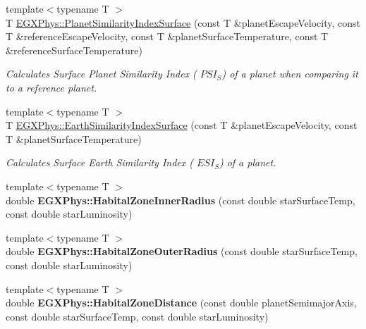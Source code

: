 \begin{DoxyCompactItemize}
{\footnotesize template$<$typename T $>$ }\\T \hyperlink{group___astrophysics_gae0c7dce2779d66b0560ca388a34ddc39}{E\+G\+X\+Phys\+::\+Planet\+Similarity\+Index\+Surface} (const T \&planet\+Escape\+Velocity, const T \&reference\+Escape\+Velocity, const T \&planet\+Surface\+Temperature, const T \&reference\+Surface\+Temperature)
\begin{DoxyCompactList}\small\item\em Calculates Surface Planet Similarity Index ( $PSI_S$) of a planet when comparing it to a reference planet. \end{DoxyCompactList}\item 
{\footnotesize template$<$typename T $>$ }\\T \hyperlink{group___astrophysics_ga1df772b0ed354ca7f7e4a7a4af072325}{E\+G\+X\+Phys\+::\+Earth\+Similarity\+Index\+Surface} (const T \&planet\+Escape\+Velocity, const T \&planet\+Surface\+Temperature)
\begin{DoxyCompactList}\small\item\em Calculates Surface Earth Similarity Index ( $ESI_S$) of a planet. \end{DoxyCompactList}\item 
\mbox{\label{group___astrophysics_ga17e667a233c12e3e05aed3fdf08d1156}} 
{\footnotesize template$<$typename T $>$ }\\double {\bfseries E\+G\+X\+Phys\+::\+Habital\+Zone\+Inner\+Radius} (const double star\+Surface\+Temp, const double star\+Luminosity)
\item 
\mbox{\label{group___astrophysics_gacdb0f5c44bfad08164ae26b5b098be45}} 
{\footnotesize template$<$typename T $>$ }\\double {\bfseries E\+G\+X\+Phys\+::\+Habital\+Zone\+Outer\+Radius} (const double star\+Surface\+Temp, const double star\+Luminosity)
\item 
\mbox{\label{group___astrophysics_ga227538d5ee00f66a5524a1daafd8dc26}} 
{\footnotesize template$<$typename T $>$ }\\double {\bfseries E\+G\+X\+Phys\+::\+Habital\+Zone\+Distance} (const double planet\+Semimajor\+Axis, const double star\+Surface\+Temp, const double star\+Luminosity)
\item 
\mbox{\label{group___astrophysics_gaa428f551c34387a00d6c376b3f33632b}} 

\end{DoxyCompactItemize}
